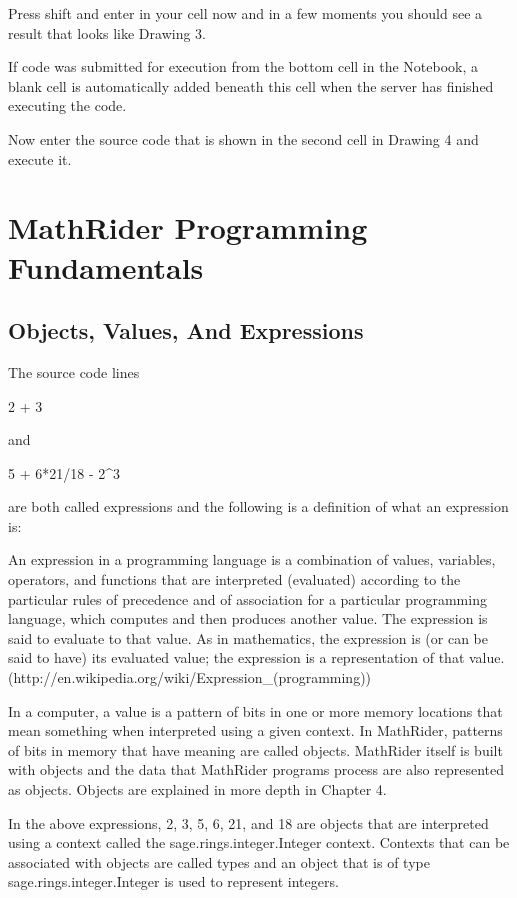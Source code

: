 \documentclass[12pt,oneside]{book}
\begin{document}
Press shift and enter in your cell now and in a few moments you should see a result that looks like Drawing 3. 

If code was submitted for execution from the bottom cell in the Notebook, a blank cell is automatically added beneath this cell when the server has finished executing the code. 

Now enter the source code that is shown in the second cell in Drawing 4 and execute it.  


\chapter[MathRider Programming Fundamentals]{MathRider Programming Fundamentals}

\section[Objects, Values, And Expressions]{Objects, Values, And Expressions}

The source code lines


2 + 3 


and 


5 + 6*21/18 {}- 2\^{}3


are both called expressions and the following is a definition of what an expression is: 

An expression in a programming language is a combination of values, variables, operators, and functions that are interpreted (evaluated) according to the particular rules of precedence and of association for a particular programming language, which computes and then produces another value. The expression is said to evaluate to that value. As in mathematics, the expression is (or can be said to have) its evaluated value; the expression is a representation of that value. (http://en.wikipedia.org/wiki/Expression\_(programming)) 

In a computer, a value is a pattern of bits in one or more memory locations that mean something when interpreted using a given context. In MathRider, patterns of bits in memory that have meaning are called objects. MathRider itself is built with objects and the data that MathRider programs process are also represented as objects. Objects are explained in more depth in Chapter 4. 

In the above expressions, 2, 3, 5, 6, 21, and 18 are objects that are interpreted using a context called the sage.rings.integer.Integer context. Contexts that can be associated with objects are called types and an object that is of type sage.rings.integer.Integer is used to represent integers. 
\end{document}
